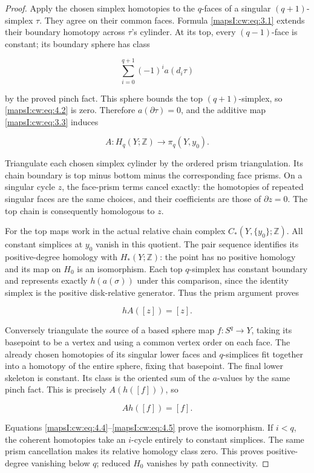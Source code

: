 \documentclass[11pt]{article}
\begin{document}
\begin{proof}
Apply the chosen simplex homotopies to the \(q\)-faces of a singular \((q+1)\)-simplex \(\tau\). They agree on their common faces. Formula \eqref{mapsI:cw:eq:3.1} extends their boundary homotopy across \(\tau\)'s cylinder. At its top, every \((q-1)\)-face is constant; its boundary sphere has class

\begin{equation}
\sum_{i=0}^{q+1}(-1)^i a(d_i\tau)
\label{mapsI:cw:eq:4.2}
\end{equation}

by the proved pinch fact. This sphere bounds the top \((q+1)\)-simplex, so \eqref{mapsI:cw:eq:4.2} is zero. Therefore \(a(\partial\tau)=0\), and the additive map \eqref{mapsI:cw:eq:3.3} induces

\begin{equation}
A:H_q(Y;\mathbb Z)\longrightarrow\pi_q(Y,y_0).
\label{mapsI:cw:eq:4.3}
\end{equation}

Triangulate each chosen simplex cylinder by the ordered prism triangulation. Its chain boundary is top minus bottom minus the corresponding face prisms. On a singular cycle \(z\), the face-prism terms cancel exactly: the homotopies of repeated singular faces are the same choices, and their coefficients are those of \(\partial z=0\). The top chain is consequently homologous to \(z\).

For the top maps work in the actual relative chain complex \(C_*(Y,\{y_0\};\mathbb Z)\). All constant simplices at \(y_0\) vanish in this quotient. The pair sequence identifies its positive-degree homology with \(H_*(Y;\mathbb Z)\): the point has no positive homology and its map on \(H_0\) is an isomorphism. Each top \(q\)-simplex has constant boundary and represents exactly \(h(a(\sigma))\) under this comparison, since the identity simplex is the positive disk-relative generator. Thus the prism argument proves

\begin{equation}
hA([z])=[z].
\label{mapsI:cw:eq:4.4}
\end{equation}

Conversely triangulate the source of a based sphere map \(f:S^q\to Y\), taking its basepoint to be a vertex and using a common vertex order on each face. The already chosen homotopies of its singular lower faces and \(q\)-simplices fit together into a homotopy of the entire sphere, fixing that basepoint. The final lower skeleton is constant. Its class is the oriented sum of the \(a\)-values by the same pinch fact. This is precisely \(A(h([f]))\), so

\begin{equation}
Ah([f])=[f].
\label{mapsI:cw:eq:4.5}
\end{equation}

Equations \eqref{mapsI:cw:eq:4.4}–\eqref{mapsI:cw:eq:4.5} prove the isomorphism. If \(i<q\), the coherent homotopies take an \(i\)-cycle entirely to constant simplices. The same prism cancellation makes its relative homology class zero. This proves positive-degree vanishing below \(q\); reduced \(H_0\) vanishes by path connectivity.
\end{proof}
\end{document}
